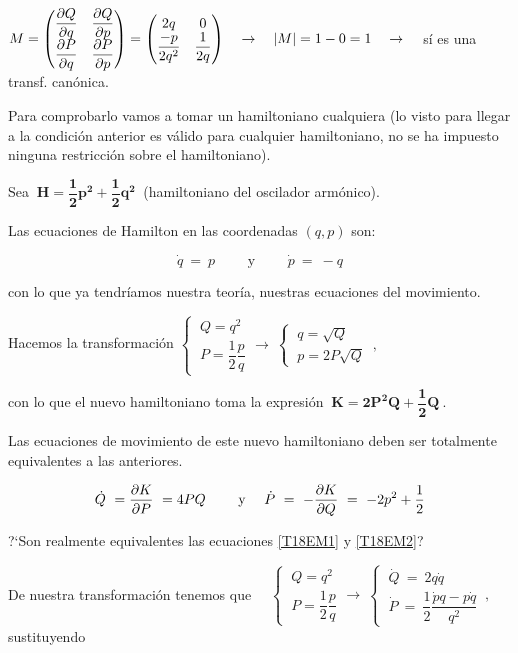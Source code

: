 $ M=\mqty( \displaystyle \pdv{Q}{q} & \displaystyle \pdv{Q}{p} \\ \displaystyle \pdv{P}{q} & \displaystyle \pdv{P}{p} )=\mqty(2q&0\\\dfrac {-p}{2q^2}&\dfrac 1{2q}) \quad \to \quad |M|=1-0=1 \quad \to \quad $ sí es una transf. canónica.

Para comprobarlo vamos a tomar un hamiltoniano cualquiera (lo visto para llegar a la condición anterior es válido para cualquier hamiltoniano, no se ha impuesto ninguna restricción sobre el hamiltoniano). 

Sea $\ \boldsymbol{H=\dfrac 1 2 p^2 + \dfrac 1 2 q^2}\ $ (hamiltoniano del oscilador armónico).

Las ecuaciones de Hamilton en las coordenadas $(q,p)$ son:

\begin{equation}
\label{T18EM1}
\dot q \ = \ p \qquad \text{ y } \qquad \dot p \ = \ -q	
\end{equation}

con lo que ya tendríamos nuestra teoría, nuestras ecuaciones del movimiento.

Hacemos la transformación 
$\begin{cases} \ Q=q^2 \\ \ P=\dfrac 1 2 \dfrac p q \end{cases}  \to \ \begin{cases} \ q=\sqrt{Q} \\ \ p=2P\sqrt{Q} \end{cases}\, , \ \ $ 

con lo que el nuevo hamiltoniano toma la expresión $\ \boldsymbol{K=2P^2Q+\dfrac 1 2 Q} \ $.

Las ecuaciones de movimiento de este nuevo hamiltoniano deben ser totalmente equivalentes a las anteriores.

\begin{equation}
\label{T18EM2}
	 \displaystyle \dot Q \ = \pdv{K}{P} \ = 4PQ \qquad \text{ y } \quad \dot P \ = \ -\pdv{K}{Q} \ = \ -2p^2+\dfrac 1 2
\end{equation}

?`Son realmente equivalentes las ecuaciones \ref{T18EM1} y \ref{T18EM2}?

De nuestra transformación tenemos que $\quad \begin{cases} \ Q=q^2 \\ \ P=\dfrac 1 2 \dfrac p q \end{cases}  \to \ \begin{cases} \ \dot Q \ = \ 2q\dot q \\ \ \dot P \ = \ \dfrac 1 2 \dfrac{\dot p q - p \dot q}{q^2}  \end{cases}\, , \ $ sustituyendo

